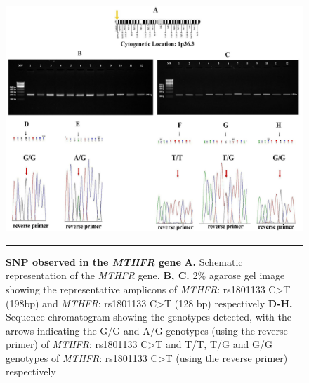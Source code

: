 \begin{refsection}
\begin{figure}
\centering
\includegraphics[scale=0.75,keepaspectratio]{Figures/Figure6_1edited.pdf}
\rule{35em}{0.5pt}
\caption[SNP observed in the \textit{MTHFR} gene]{\textbf{SNP observed in the \textit{MTHFR} gene}
\textbf{A.} Schematic representation of the \textit{MTHFR} gene. \textbf{B, C.} 2\% agarose gel image showing the representative amplicons of \textit{MTHFR}: rs1801133 C>T (198bp) and \textit{MTHFR}: rs1801133 C>T (128 bp) respectively \textbf{D-H.} Sequence chromatogram showing the genotypes detected, with the arrows indicating the G/G and A/G genotypes (using the reverse primer) of \textit{MTHFR}: rs1801133 C>T and T/T, T/G and G/G genotypes of \textit{MTHFR}: rs1801133 C>T (using the reverse primer) respectively}
\label{fig:6_1}
\end{figure}


\end{refsection}
